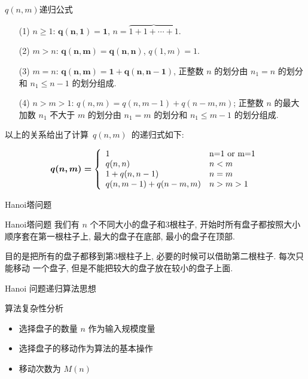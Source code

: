 \documentclass[fontset=fandol,UTF8,fleqn]{beamer}
\begin{document}
\begin{frame}{$q(n,m)$递归公式}
\begin{itemize}[<+-|alert@+>]
  \item[(1)] $n\geq 1$: $\boldsymbol{q(n,1)=1}$,  
$n=\overbrace{1+1+\cdots +1}$. 
  \item[(2)] $m>n$: $\boldsymbol{q(n,m)=q(n,n)}$,
 $q(1,m)=1$. 
\item[(3)] $m=n$: $\boldsymbol{q(n,m)=1+q(n,n-1)}$, 正整数 $n$ 的划分由 $n_1=n$
  的划分和 $n_1\leq n-1$ 的划分组成. 
  \item[(4)] $n>m>1$: $q(n,m)=q(n,m-1)+q(n-m,m)$; 正整数 $n$ 的最大加数 $n_1
$ 不大于 $m$ 的划分由 $n_1=m$ 的划分和 $n_1\leq m-1$ 的划分组成. 
\end{itemize}
\end{frame}

\begin{frame}{}
  以上的关系给出了计算~$q(n, m)$~的递归式如下:  
  \begin{exampleblock}{}
    \begin{displaymath}
\boldsymbol{ q(n, m)=}\left\{\begin{array}{lll}
1 & $n=1 or\   m=1$   \\
q(n, n) & n<m   \\
1+q(n, n-1) & n=m   \\
q(n, m-1)+q(n-m, m) & n>m>1  
\end{array} \right. 
\end{displaymath}
\end{exampleblock}
\end{frame}

\begin{frame}{Hanoi塔问题}
  \begin{exampleblock}{Hanoi塔问题}
     我们有 $n$ 个不同大小的盘子和3根柱子, 开始时所有盘子都按照大小顺序套在第一根柱子上, 最大的盘子在底部, 最小的盘子在顶部.  

目的是把所有的盘子都移到第3根柱子上, 必要的时候可以借助第二根柱子. 每次只能移动
一个盘子, 但是不能把较大的盘子放在较小的盘子上面.  
\end{exampleblock}
\end{frame}

\begin{frame}{Hanoi 问题递归算法思想}
\end{frame}

\begin{frame}{算法复杂性分析}
\begin{itemize}[<+-|alert@+>]
\item 选择盘子的数量 $n$ 作为输入规模度量 
\item 选择盘子的移动作为算法的基本操作  
\item 移动次数为 $M(n)$  
\end{itemize}
\end{frame}
\end{document}
